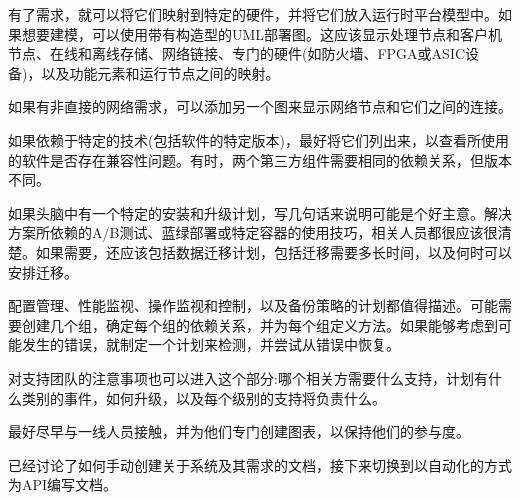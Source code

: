 有了需求，就可以将它们映射到特定的硬件，并将它们放入运行时平台模型中。如果想要建模，可以使用带有构造型的UML部署图。这应该显示处理节点和客户机节点、在线和离线存储、网络链接、专门的硬件(如防火墙、FPGA或ASIC设备)，以及功能元素和运行节点之间的映射。

如果有非直接的网络需求，可以添加另一个图来显示网络节点和它们之间的连接。

如果依赖于特定的技术(包括软件的特定版本)，最好将它们列出来，以查看所使用的软件是否存在兼容性问题。有时，两个第三方组件需要相同的依赖关系，但版本不同。

如果头脑中有一个特定的安装和升级计划，写几句话来说明可能是个好主意。解决方案所依赖的A/B测试、蓝绿部署或特定容器的使用技巧，相关人员都很应该很清楚。如果需要，还应该包括数据迁移计划，包括迁移需要多长时间，以及何时可以安排迁移。

配置管理、性能监视、操作监视和控制，以及备份策略的计划都值得描述。可能需要创建几个组，确定每个组的依赖关系，并为每个组定义方法。如果能够考虑到可能发生的错误，就制定一个计划来检测，并尝试从错误中恢复。

对支持团队的注意事项也可以进入这个部分:哪个相关方需要什么支持，计划有什么类别的事件，如何升级，以及每个级别的支持将负责什么。

最好尽早与一线人员接触，并为他们专门创建图表，以保持他们的参与度。

已经讨论了如何手动创建关于系统及其需求的文档，接下来切换到以自动化的方式为API编写文档。









